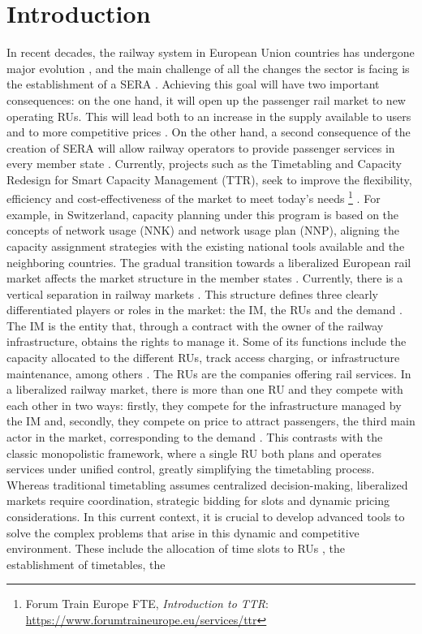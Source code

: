 \documentclass[Afour,sagev,times]{sagej}
\begin{document}
\maketitle

\section{Introduction}
\label{sec:introduction}
In recent decades, the railway system in European Union countries has undergone major evolution \cite{Ait2021}, and the main challenge of all the changes the sector is facing is the establishment of a \gls{SERA} \cite{COM2011}. Achieving this goal will have two important consequences: on the one hand, it will open up the passenger rail market to new operating \glspl{RU}. This will lead both to an increase in the supply available to users and to more competitive prices \cite{Caramello2017}. On the other hand, a second consequence of the creation of \gls{SERA} will allow railway operators to provide passenger services in every member state \cite{Caramello2017}. Currently, projects such as the Timetabling and Capacity Redesign for Smart Capacity Management (TTR), seek to improve the flexibility, efficiency and cost-effectiveness of the market to meet today's needs \footnote{Forum Train Europe FTE, \textit{Introduction to TTR}: \url{https://www.forumtraineurope.eu/services/ttr}} . For example, in Switzerland, capacity planning under this program is based on the concepts of network usage (NNK) and network usage plan (NNP), aligning the capacity assignment strategies with the existing national tools available and the neighboring countries. The gradual transition towards a liberalized European rail market affects the market structure in the member states \cite{Ait2021}. Currently, there is a vertical separation in railway markets \cite{Bouf05}. This structure defines three clearly differentiated players or roles in the market: the \gls{IM}, the \glspl{RU} and the demand \cite{Besinovic2024}. The \gls{IM} is the entity that, through a contract with the owner of the railway infrastructure, obtains the rights to manage it. Some of its functions include the capacity allocated to the different \glspl{RU}, track access charging, or infrastructure maintenance, among others \cite{Pena2015}. The \glspl{RU} are the companies offering rail services. In a liberalized railway market, there is more than one \gls{RU} and they compete with each other in two ways: firstly, they compete for the infrastructure managed by the \gls{IM} and, secondly, they compete on price to attract passengers, the third main actor in the market, corresponding to the demand \cite{Link04}. This contrasts with the classic monopolistic framework, where a single \gls{RU} both plans and operates services under unified control, greatly simplifying the timetabling process. Whereas traditional timetabling assumes centralized decision-making, liberalized markets require coordination, strategic bidding for slots and dynamic pricing considerations. In this current context, it is crucial to develop advanced tools to solve the complex problems that arise in this dynamic and competitive environment. These include the allocation of time slots to \glspl{RU} \cite{Besinovic2024}, the establishment of timetables, the 
\end{document}
